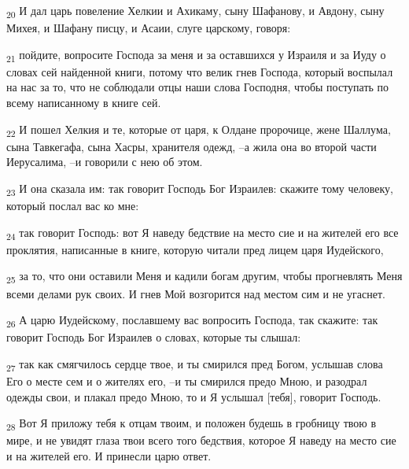 \begin{tcolorbox}
\textsubscript{20} И дал царь повеление Хелкии и Ахикаму, сыну Шафанову, и Авдону, сыну Михея, и Шафану писцу, и Асаии, слуге царскому, говоря:
\end{tcolorbox}
\begin{tcolorbox}
\textsubscript{21} пойдите, вопросите Господа за меня и за оставшихся у Израиля и за Иуду о словах сей найденной книги, потому что велик гнев Господа, который воспылал на нас за то, что не соблюдали отцы наши слова Господня, чтобы поступать по всему написанному в книге сей.
\end{tcolorbox}
\begin{tcolorbox}
\textsubscript{22} И пошел Хелкия и те, которые от царя, к Олдане пророчице, жене Шаллума, сына Тавкегафа, сына Хасры, хранителя одежд, --а жила она во второй части Иерусалима, --и говорили с нею об этом.
\end{tcolorbox}
\begin{tcolorbox}
\textsubscript{23} И она сказала им: так говорит Господь Бог Израилев: скажите тому человеку, который послал вас ко мне:
\end{tcolorbox}
\begin{tcolorbox}
\textsubscript{24} так говорит Господь: вот Я наведу бедствие на место сие и на жителей его все проклятия, написанные в книге, которую читали пред лицем царя Иудейского,
\end{tcolorbox}
\begin{tcolorbox}
\textsubscript{25} за то, что они оставили Меня и кадили богам другим, чтобы прогневлять Меня всеми делами рук своих. И гнев Мой возгорится над местом сим и не угаснет.
\end{tcolorbox}
\begin{tcolorbox}
\textsubscript{26} А царю Иудейскому, пославшему вас вопросить Господа, так скажите: так говорит Господь Бог Израилев о словах, которые ты слышал:
\end{tcolorbox}
\begin{tcolorbox}
\textsubscript{27} так как смягчилось сердце твое, и ты смирился пред Богом, услышав слова Его о месте сем и о жителях его, --и ты смирился предо Мною, и разодрал одежды свои, и плакал предо Мною, то и Я услышал [тебя], говорит Господь.
\end{tcolorbox}
\begin{tcolorbox}
\textsubscript{28} Вот Я приложу тебя к отцам твоим, и положен будешь в гробницу твою в мире, и не увидят глаза твои всего того бедствия, которое Я наведу на место сие и на жителей его. И принесли царю ответ.
\end{tcolorbox}
